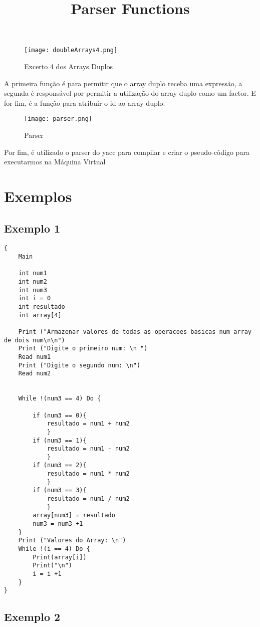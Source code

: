 \documentclass[11pt,a4paper]{report}%
\begin{document}
\newpage
\begin{figure}[htbp]
\centerline{\texttt{[image: doubleArrays4.png]}}
\caption{Excerto 4 dos Arrays Duplos}
\label{fig}
\end{figure}

A primeira função é para permitir que o array duplo receba uma expressão, a segunda é responsável por permitir a utilização do array duplo como um factor. E for fim, é a função para atribuir o id ao array duplo.\\

\title{\textbf{Parser Functions}}
\begin{figure}[htbp]
\centerline{\texttt{[image: parser.png]}}
\caption{Parser}
\label{fig}
\end{figure}

Por fim, é utilizado o parser do yacc para compilar e criar o pseudo-código para executarmos na Máquina Virtual

\newpage
\section{Exemplos} \label{sec:ex}
\subsection{Exemplo 1} 

\begin{verbatim}
{
    Main 

    int num1 
    int num2 
    int num3
    int i = 0
    int resultado
    int array[4] 

    Print ("Armazenar valores de todas as operacoes basicas num array de dois num\n\n")
    Print ("Digite o primeiro num: \n ")
    Read num1
    Print ("Digite o segundo num: \n")
    Read num2 


    While !(num3 == 4) Do {

        if (num3 == 0){
            resultado = num1 + num2
            }
        if (num3 == 1){
            resultado = num1 - num2
            }
        if (num3 == 2){
            resultado = num1 * num2
            }
        if (num3 == 3){
            resultado = num1 / num2
            }
        array[num3] = resultado
        num3 = num3 +1
    }
    Print ("Valores do Array: \n")
    While !(i == 4) Do {
        Print(array[i])
        Print("\n")
        i = i +1
    }
}
\end{verbatim}

\newpage
\subsection{Exemplo 2}
\end{document}
